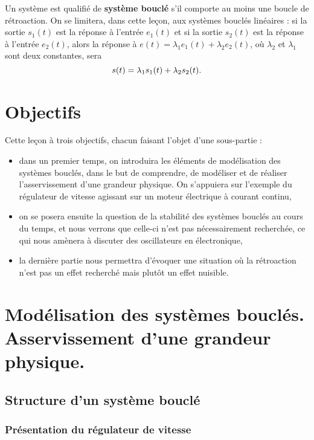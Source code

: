 \documentclass[11pt,a4paper]{report}
\begin{document}
Un système est qualifié de \textbf{système bouclé} s'il comporte au moins une boucle de rétroaction. On se limitera, dans cette leçon, aux systèmes bouclés linéaires : si la sortie $s_1(t)$ est la réponse à l'entrée $e_1(t)$ et si la sortie $s_2(t)$ est la réponse à l'entrée $e_2(t)$, alors la réponse à $e(t) = \lambda_1 e_1(t) + \lambda_2 e_2(t)$, où $\lambda_2$ et $\lambda_1$ sont deux constantes, sera
\begin{equation}
	s(t) = \lambda_1 s_1(t) + \lambda_2 s_2(t).\\
\end{equation}

\newpage
\section*{Objectifs}

Cette leçon à trois objectifs, chacun faisant l'objet d'une sous-partie :
\begin{itemize}
	\item dans un premier temps, on introduira les éléments de modélisation des systèmes bouclés, dans le but de comprendre, de modéliser et de réaliser l'asservissement d'une grandeur physique. On s'appuiera sur l'exemple du régulateur de vitesse agissant sur un moteur électrique à courant continu,
	\item on se posera ensuite la question de la stabilité des systèmes bouclés au cours du temps, et nous verrons que celle-ci n'est pas nécessairement recherchée, ce qui nous amènera à discuter des oscillateurs en électronique,
	\item la dernière partie nous permettra d'évoquer une situation où la rétroaction n'est pas un effet recherché mais plutôt un effet nuisible.
\end{itemize}

\newpage
\section{Modélisation des systèmes bouclés.\\ Asservissement d'une grandeur physique.}

\subsection{Structure d'un système bouclé}

\subsubsection{Présentation du régulateur de vitesse}
\end{document}
